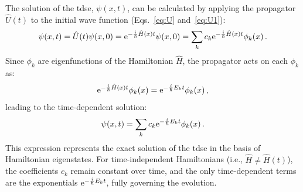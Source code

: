 The solution of the \acrshort{tdse}, $\psi(x,t)$, can be calculated by applying the propagator $\hat{U}(t)$ to the initial wave function (Eqs.~\eqref{eq:U} and~\eqref{eq:U1}):
\begin{equation}
    \psi(x,t) = \hat{U}(t)\psi(x,0) = \mathrm{e}^{-\frac{i}{\hbar}\hat{H}(x)t} \psi(x,0) = \sum_k c_k \mathrm{e}^{-\frac{i}{\hbar}\hat{H}(x)t} \phi_k(x) \, .
\end{equation}
Since $\phi_k$ are eigenfunctions of the Hamiltonian $\hat{H}$, the propagator acts on each $\phi_k$ as:
\begin{equation}
    \mathrm{e}^{-\frac{i}{\hbar}\hat{H}(x)t} \phi_k(x) = \mathrm{e}^{-\frac{i}{\hbar}E_k t} \phi_k(x) \, ,
\end{equation}
leading to the time-dependent solution:
\begin{equation}
    \psi(x,t) = \sum_k c_k \mathrm{e}^{-\frac{i}{\hbar}E_k t}\phi_k(x) \, .
    \label{eq:tdpsi1}
\end{equation}
This expression represents the exact solution of the \acrshort{tdse} in the basis of Hamiltonian eigenstates. For time-independent Hamiltonians (i.e., $\hat{H} \neq \hat{H}(t)$), the coefficients $c_k$ remain constant over time, and the only time-dependent terms are the exponentials $\mathrm{e}^{-\frac{i}{\hbar}E_k t}$, fully governing the evolution.


